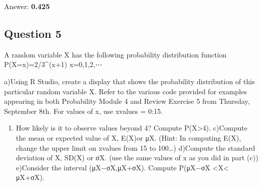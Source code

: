 \documentclass[
]{article}
\providecommand{\tightlist}{%
  \setlength{\itemsep}{0pt}\setlength{\parskip}{0pt}}
\begin{document}
Answer: \textbf{0.425}

\hypertarget{question-5}{%
\subsection{Question 5}\label{question-5}}

A random variable X has the following probability distribution function
P(X=x)=2/3\^{}(x+1) x=0,1,2,⋯

a)Using R Studio, create a display that shows the probability
distribution of this particular random variable X. Refer to the various
code provided for examples appearing in both Probability Module 4 and
Review Exercise 5 from Thursday, September 8th. For values of x, use
xvalues = 0:15.

\begin{enumerate}
\def\labelenumi{\alph{enumi})}
\setcounter{enumi}{1}
\tightlist
\item
  How likely is it to observe values beyond 4? Compute
  P(X\textgreater4). c)Compute the mean or expected value of X, E(X)or
  μX. (Hint: In computing E(X), change the upper limit on xvalues from
  15 to 100\ldots) d)Compute the standard deviation of X, SD(X) or σX.
  (use the same values of x as you did in part (c)) e)Consider the
  interval (μX−σX,μX+σX). Compute P(μX−σX \textless X\textless{} μX+σX).
\end{enumerate}
\end{document}
